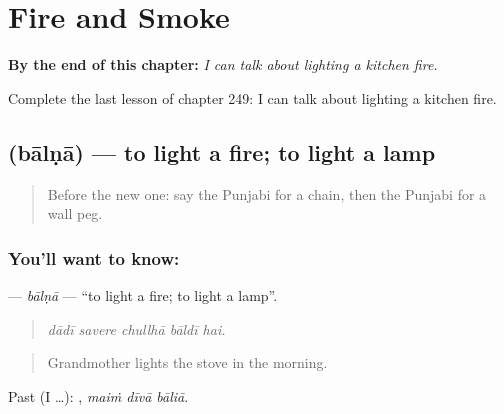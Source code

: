 
\chapter{Fire and Smoke}
\label{ch:pa-a2-fire-and-smoke}

\begin{chapteropening}
\textbf{By the end of this chapter:} \emph{I can talk about lighting a kitchen fire.}

Complete the last lesson of chapter 249: I can talk about lighting a kitchen fire.
\end{chapteropening}

\section[\texorpdfstring{\pa{ਬਾਲਣਾ} (bālṇā)}{ਬਾਲਣਾ (bālṇā)}]{ (bālṇā) — to light a fire; to light a lamp}

\label{lesson:PA-C249-balna-kindle}



\begin{quote}
Before the new one: say the Punjabi for a chain, then the Punjabi for a wall peg.
\end{quote}

\subsection*{You'll want to know: }
\textbf{} — \emph{bālṇā} — \textquotedblleft{}to light a fire; to light a lamp\textquotedblright{}.

\begin{quote}
    
\end{quote}

\begin{quote}
\emph{dādī savere chullhā bāldī hai.}
\end{quote}

\begin{quote}
Grandmother lights the stove in the morning.
\end{quote}

Past (I …):   , \emph{maiṁ dīvā bāliā}.

